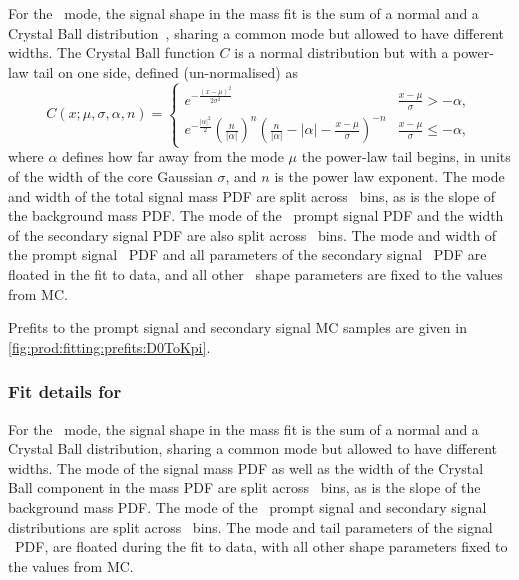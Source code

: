 For the \DzToKpi\ mode, the signal shape in the mass fit is the sum of a normal 
and a Crystal Ball distribution~\cite{Skwarnicki:1986xj}, sharing a common mode 
but allowed to have different widths.
The Crystal Ball function $C$ is a normal distribution but with a power-law 
tail on one side, defined (un-normalised) as
\begin{equation}
  C(x; \mu, \sigma, \alpha, n) = \begin{cases}
    e^{-\frac{{(x - \mu)}^{2}}{2\sigma^{2}}}                          & \frac{x - \mu}{\sigma} > -\alpha, \\
    e^{-\frac{|\alpha|^{2}}{2}}
      {(\frac{n}{|\alpha|})}^{n}
      {(\frac{n}{|\alpha|} - |\alpha| - \frac{x - \mu}{\sigma})}^{-n} & \frac{x - \mu}{\sigma} \leq -\alpha,
  \end{cases}
  \label{eqn:prod:fitting:crystal_ball}
\end{equation}
where $\alpha$ defines how far away from the mode $\mu$ the power-law tail 
begins, in units of the width of the core Gaussian $\sigma$, and $n$ is the 
power law exponent.
The mode and width of the total signal mass \ac{PDF} are split across \pTy\ 
bins, as is the slope of the background mass \ac{PDF}.
The mode of the \lnipchisq\ prompt signal \ac{PDF} and the width of the 
secondary signal \ac{PDF} are also split across \pTy\ bins.
The mode and width of the prompt signal \lnipchisq\ \ac{PDF} and all parameters 
of the secondary signal \lnipchisq\ \ac{PDF} are floated in the fit to data, 
and all other \lnipchisq\ shape parameters are fixed to the values from 
\ac{MC}.

Prefits to the prompt signal and secondary signal \ac{MC} samples are given in 
\cref{fig:prod:fitting:prefits:D0ToKpi}.

\subsubsection*{Fit details for \PDplus}
\label{chap:prod:fitting:details:DpToKpipi}

For the \DpToKpipi\ mode, the signal shape in the mass fit is the sum of a 
normal and a Crystal Ball distribution, sharing a common mode but allowed to 
have different widths.
The mode of the signal mass \ac{PDF} as well as the width of the Crystal Ball 
component in the mass \ac{PDF} are split across \pTy\ bins, as is the slope of 
the background mass \ac{PDF}.
The mode of the \lnipchisq\ prompt signal and secondary signal distributions 
are split across \pTy\ bins.
The mode and tail parameters of the signal \lnipchisq\ \ac{PDF}, are floated 
during the fit to data, with all other shape parameters fixed to the values 
from \ac{MC}.

